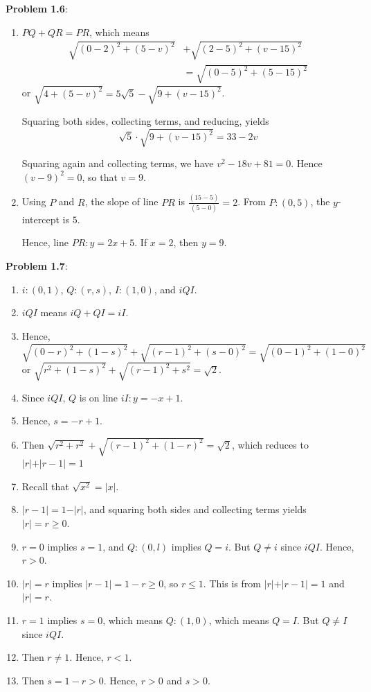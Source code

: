 \documentclass[english]{book}
\begin{document}
\textbf{Problem 1.6}:
\begin{enumerate}[\hspace{1cm}(a)]
  \item $PQ+QR = PR$, which means 
        \begin{align*}
        \sqrt{ (0-2)^2 + (5-v)^2 } & + \sqrt{ (2-5)^2 + (v-15)^2 } \\
                                   & = \sqrt{ (0-5)^2 + (5-15)^2 }
        \end{align*}
        or $\sqrt{ 4 + (5-v)^2 } = 5 \sqrt{5} - \sqrt{ 9 + (v-15)^2 }$.

        Squaring both sides, collecting terms, and reducing, yields 
        \begin{equation*}
        \sqrt{5} \cdot \sqrt{ 9 + (v-15)^2 } = 33-2v
        \end{equation*}

        Squaring again and collecting terms, we have $v^2-18v+81=0$. Hence $(v-9)^2=0$, so that $v=9$.
  \item Using $P$ and $R$, the slope of line $PR$ is $\frac{(15-5)}{(5-0)}=2$. From $P:(0,5)$, the $y$-intercept is $5$.

        Hence, line $PR:y = 2x+5$. If $x=2$, then $y=9$.
\end{enumerate}

\textbf{Problem 1.7}:
\begin{enumerate}[\hspace{1cm}1)]
  \item $i:(0,1)$, $Q:(r,s)$, $I:(1,0)$, and $iQI$.
  \item $iQI$ means $iQ+QI=iI$.
  \item Hence, 
    \begin{equation*}
    \sqrt{(0-r)^{2} + (1-s)^{2} } + \sqrt{(r-1)^{2} + (s-0)^{2} } = \sqrt{ (0-1)^{2}+(1-0)^{2} }
    \end{equation*}
    or $\sqrt{r^{2} + (1-s)^{2} } + \sqrt{(r-1)^{2} + s^{2} } = \sqrt{2}$.
  \item Since $iQI$, $Q$ is on line $iI: y=-x+1$.
  \item Hence, $s = -r+1$.
  \item Then $\sqrt{r^{2} + r^{2}} + \sqrt{ (r-1)^{2} + (1-r)^{2} } = \sqrt{2}$, which reduces to $\vert r \vert  +  \vert r-1 \vert  = 1$
  \item Recall that $\sqrt{x^{2}} = \vert x \vert$. 
  \item $\vert r-1 \vert = 1 - \vert r \vert$, and squaring both sides and collecting terms yields $\vert r \vert = r \geq 0$. 
  \item $r = 0$ implies $s = 1$, and $Q:(0,l)$ implies $Q = i$. But $Q \neq i$ since $iQI$. Hence, $r > 0$. 
  \item $\vert r \vert = r$ implies $\vert r-1 \vert = 1 - r \geq 0$, so $r \leq 1$. This is from $\vert r \vert + \vert r-1 \vert = 1$ and $\vert r \vert = r$.
  \item $r = 1$ implies $s = 0$, which means $Q:(1,0)$, which means $Q=I$. But $Q \neq I$ since $iQI$.
  \item Then $r \neq 1$. Hence, $r<1$. 
  \item Then $s = 1-r > 0$. Hence, $r>0$ and $s>0$.
\end{enumerate}
\end{document}

